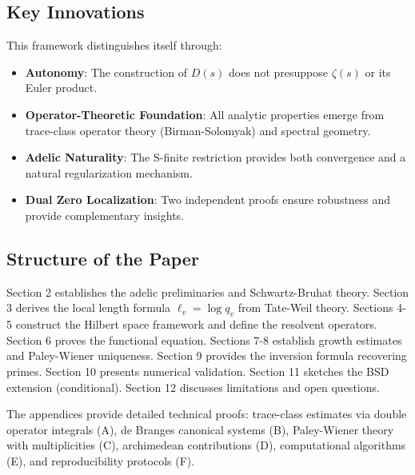 \subsection{Key Innovations}

This framework distinguishes itself through:

\begin{itemize}
  \item \textbf{Autonomy}: The construction of $D(s)$ does not presuppose $\zeta(s)$ or its Euler product.
  
  \item \textbf{Operator-Theoretic Foundation}: All analytic properties emerge from trace-class operator theory (Birman-Solomyak) and spectral geometry.
  
  \item \textbf{Adelic Naturality}: The S-finite restriction provides both convergence and a natural regularization mechanism.
  
  \item \textbf{Dual Zero Localization}: Two independent proofs ensure robustness and provide complementary insights.
\end{itemize}

\subsection{Structure of the Paper}

Section 2 establishes the adelic preliminaries and Schwartz-Bruhat theory. Section 3 derives the local length formula $\ell_v = \log q_v$ from Tate-Weil theory. Sections 4-5 construct the Hilbert space framework and define the resolvent operators. Section 6 proves the functional equation. Sections 7-8 establish growth estimates and Paley-Wiener uniqueness. Section 9 provides the inversion formula recovering primes. Section 10 presents numerical validation. Section 11 sketches the BSD extension (conditional). Section 12 discusses limitations and open questions.

The appendices provide detailed technical proofs: trace-class estimates via double operator integrals (A), de Branges canonical systems (B), Paley-Wiener theory with multiplicities (C), archimedean contributions (D), computational algorithms (E), and reproducibility protocols (F).
